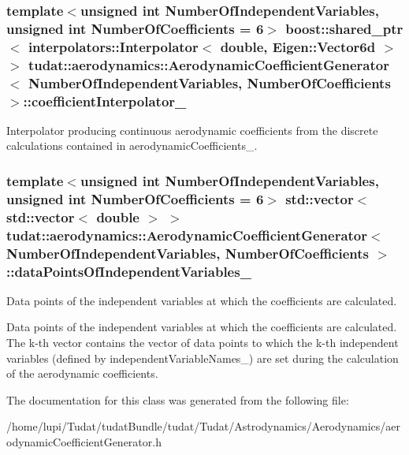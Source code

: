\subsubsection[{\texorpdfstring{coefficient\+Interpolator\+\_\+}{coefficientInterpolator_}}]{\setlength{\rightskip}{0pt plus 5cm}template$<$unsigned int Number\+Of\+Independent\+Variables, unsigned int Number\+Of\+Coefficients = 6$>$ boost\+::shared\+\_\+ptr$<$ {\bf interpolators\+::\+Interpolator}$<$ double, Eigen\+::\+Vector6d $>$ $>$ {\bf tudat\+::aerodynamics\+::\+Aerodynamic\+Coefficient\+Generator}$<$ Number\+Of\+Independent\+Variables, Number\+Of\+Coefficients $>$\+::coefficient\+Interpolator\+\_\+\hspace{0.3cm}{\ttfamily [protected]}}\hypertarget{classtudat_1_1aerodynamics_1_1AerodynamicCoefficientGenerator_aa8717ac85b4f9ff9ee4cccbafaccb8b6}{}\label{classtudat_1_1aerodynamics_1_1AerodynamicCoefficientGenerator_aa8717ac85b4f9ff9ee4cccbafaccb8b6}
Interpolator producing continuous aerodynamic coefficients from the discrete calculations contained in aerodynamic\+Coefficients\+\_\+. 
\subsubsection[{\texorpdfstring{data\+Points\+Of\+Independent\+Variables\+\_\+}{dataPointsOfIndependentVariables_}}]{\setlength{\rightskip}{0pt plus 5cm}template$<$unsigned int Number\+Of\+Independent\+Variables, unsigned int Number\+Of\+Coefficients = 6$>$ std\+::vector$<$ std\+::vector$<$ double $>$ $>$ {\bf tudat\+::aerodynamics\+::\+Aerodynamic\+Coefficient\+Generator}$<$ Number\+Of\+Independent\+Variables, Number\+Of\+Coefficients $>$\+::data\+Points\+Of\+Independent\+Variables\+\_\+\hspace{0.3cm}{\ttfamily [protected]}}\hypertarget{classtudat_1_1aerodynamics_1_1AerodynamicCoefficientGenerator_a14278ec758b9bfbfa73c5564abce310f}{}\label{classtudat_1_1aerodynamics_1_1AerodynamicCoefficientGenerator_a14278ec758b9bfbfa73c5564abce310f}


Data points of the independent variables at which the coefficients are calculated. 

Data points of the independent variables at which the coefficients are calculated. The k-\/th vector contains the vector of data points to which the k-\/th independent variables (defined by independent\+Variable\+Names\+\_\+) are set during the calculation of the aerodynamic coefficients. 

The documentation for this class was generated from the following file\+:\begin{DoxyCompactItemize}
\item 
/home/lupi/\+Tudat/tudat\+Bundle/tudat/\+Tudat/\+Astrodynamics/\+Aerodynamics/aerodynamic\+Coefficient\+Generator.\+h\end{DoxyCompactItemize}
